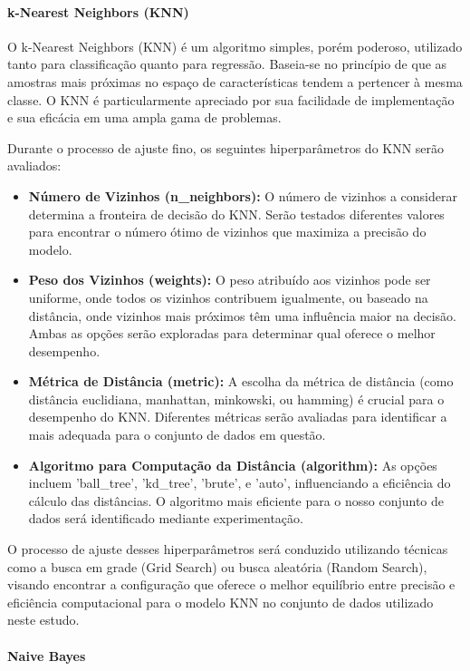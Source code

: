 \paragraph{k-Nearest Neighbors (KNN)}

O k-Nearest Neighbors (KNN) é um algoritmo simples, porém poderoso, utilizado tanto para classificação quanto para regressão. Baseia-se no princípio de que as amostras mais próximas no espaço de características tendem a pertencer à mesma classe. O KNN é particularmente apreciado por sua facilidade de implementação e sua eficácia em uma ampla gama de problemas.

Durante o processo de ajuste fino, os seguintes hiperparâmetros do KNN serão avaliados:

\begin{itemize}
    \item \textbf{Número de Vizinhos (n\_neighbors):} O número de vizinhos a considerar determina a fronteira de decisão do KNN. Serão testados diferentes valores para encontrar o número ótimo de vizinhos que maximiza a precisão do modelo.
    \item \textbf{Peso dos Vizinhos (weights):} O peso atribuído aos vizinhos pode ser uniforme, onde todos os vizinhos contribuem igualmente, ou baseado na distância, onde vizinhos mais próximos têm uma influência maior na decisão. Ambas as opções serão exploradas para determinar qual oferece o melhor desempenho.
    \item \textbf{Métrica de Distância (metric):} A escolha da métrica de distância (como distância euclidiana, manhattan, minkowski, ou hamming) é crucial para o desempenho do KNN. Diferentes métricas serão avaliadas para identificar a mais adequada para o conjunto de dados em questão.
    \item \textbf{Algoritmo para Computação da Distância (algorithm):} As opções incluem 'ball\_tree', 'kd\_tree', 'brute', e 'auto', influenciando a eficiência do cálculo das distâncias. O algoritmo mais eficiente para o nosso conjunto de dados será identificado mediante experimentação.
\end{itemize}

O processo de ajuste desses hiperparâmetros será conduzido utilizando técnicas como a busca em grade (Grid Search) ou busca aleatória (Random Search), visando encontrar a configuração que oferece o melhor equilíbrio entre precisão e eficiência computacional para o modelo KNN no conjunto de dados utilizado neste estudo.

\paragraph{Naive Bayes}

